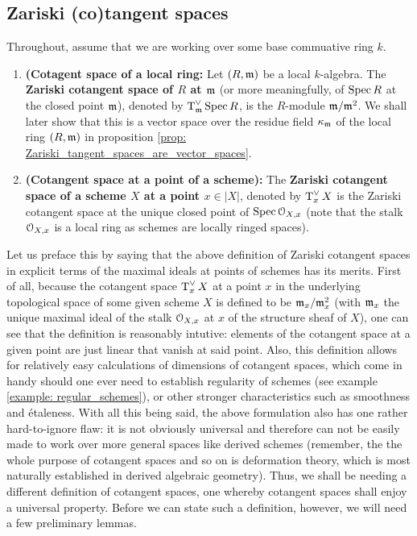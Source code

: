         \subsection{Zariski (co)tangent spaces}
            \begin{definition} \label{def: zariski_tangent_spaces} 
                Throughout, assume that we are working over some base commuative ring $k$. 
                \begin{enumerate}
                    \item \textbf{(Cotagent space of a local ring:} Let $(R, \mathfrak{m})$ be a local $k$-algebra. The \textbf{Zariski cotangent space of $R$ at $\mathfrak{m}$} (or more meaningfully, of $\operatorname{Spec} R$ at the closed point $\mathfrak{m}$), denoted by $\operatorname{T}^{\vee}_{\mathfrak{m}}\operatorname{Spec} R$, is the $R$-module $\mathfrak{m}/\mathfrak{m}^2$. We shall later show that this is a vector space over the residue field $\kappa_{\mathfrak{m}}$ of the local ring $(R, \mathfrak{m})$ in proposition \ref{prop: Zariski_tangent_spaces_are_vector_spaces}.   
                    \item \textbf{(Cotangent space at a point of a scheme):} The \textbf{Zariski cotangent space of a scheme $X$ at a point $x \in |X|$}, denoted by $\operatorname{T}^{\vee}_xX$ is the Zariski cotangent space at the unique closed point of $\operatorname{Spec} \mathcal{O}_{X, x}$ (note that the stalk $\mathcal{O}_{X, x}$ is a local ring as schemes are locally ringed spaces).
                \end{enumerate}
            \end{definition}
            \begin{remark}
                Let us preface this by saying that the above definition of Zariski cotangent spaces in explicit terms of the maximal ideals at points of schemes has its merits. First of all, because the cotangent space $\operatorname{T}^{\vee}_xX$ at a point $x$ in the underlying topological space of some given scheme $X$ is defined to be $\mathfrak{m}_x/\mathfrak{m}_x^2$ (with $\mathfrak{m}_x$ the unique maximal ideal of the stalk $\mathcal{O}_{X, x}$ at $x$ of the structure sheaf of $X$), one can see that the definition is reasonably intutive: elements of the cotangent space at a given point are just linear  that vanish at said point. Also, this definition allows for relatively easy calculations of dimensions of cotangent spaces, which come in handy should one ever need to establish regularity of schemes (see example \ref{example: regular_schemes}), or other stronger characteristics such as smoothness and \'etaleness. With all this being said, the above formulation also has one rather hard-to-ignore flaw: it is not obviously universal and therefore can not be easily made to work over more general spaces like derived schemes (remember, the the whole purpose of cotangent spaces and so on is deformation theory, which is most naturally established in derived algebraic geometry). Thus, we shall be needing a different definition of cotangent spaces, one whereby cotangent spaces shall enjoy a universal property. Before we can state such a definition, however, we will need a few preliminary lemmas.
            \end{remark}
            
